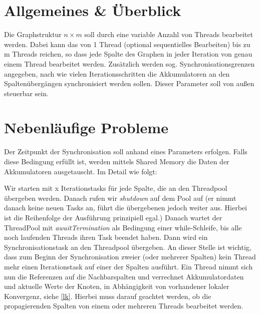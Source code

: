 
\usepackage{pdfpages}
\usepackage{listings}



\newcommand{\subttl}{\textbf{Milestone 1}}
\newcommand{\StudNameOne}{Christoph Rosenhauer (2549220)}
\newcommand{\StudNameTwo}{Lukas Schaal (2539218)}
\newcommand{\StudNameThree}{Jens Heinen (2542182)}


\section{Allgemeines \& Überblick}
Die Graphstruktur $n \times m$ soll durch eine variable Anzahl von Threads bearbeitet werden. Dabei kann das von 1 Thread (optional sequentielles Bearbeiten) bis zu m Threads reichen, so dass jede Spalte des Graphen in jeder Iteration von genau einem Thread bearbeitet werden. 
Zusätzlich werden sog. Synchronisationsgrenzen  angegeben, nach wie vielen Iterationsschritten die Akkumulatoren an den Spaltenübergängen synchronisiert werden sollen. Dieser Parameter soll von außen steuerbar sein. 

\section{Nebenläufige Probleme}
Der Zeitpunkt der Synchronisation soll anhand eines Parameters erfolgen. Falls diese Bedingung erfüllt ist, werden mittels Shared Memory die Daten der Akkumulatoren ausgetauscht. Im Detail wie folgt:

Wir starten mit x Iterationstasks für jede Spalte, die an den Threadpool übergeben werden. Danach rufen wir \textit{shutdown}  auf dem Pool auf (er nimmt danach keine neuen Tasks an, führt die übergebenen jedoch weiter aus. Hierbei ist die Reihenfolge der Ausführung prinzipiell egal.) Danach wartet der ThreadPool mit \textit{awaitTermination} als Bedingung einer while-Schleife, bis alle noch laufenden Threads ihren Task beendet haben.
Dann wird ein Synchronisationstask an den Threadpool übergeben. An dieser Stelle ist wichtig, dass zum Beginn der Synchronisation zweier (oder mehrerer Spalten) kein Thread mehr einen Iterationstask auf einer der Spalten ausführt. Ein Thread nimmt sich nun die Referenzen auf die Nachbarspalten und verrechnet Akkumulatordaten und aktuelle Werte der Knoten, in Abhängigkeit von vorhandener lokaler Konvergenz, siehe \ref{lk}. Hierbei muss darauf geachtet werden, ob die propagierenden Spalten von einem oder mehreren Threads bearbeitet werden.

